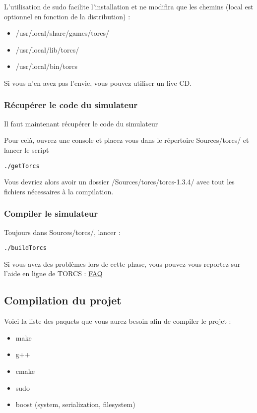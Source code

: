 \documentclass[a4paper,12pt]{article}
\begin{document}
  
  L'utilisation de sudo facilite l'installation et ne modifira que les chemins (local est optionnel en fonction de la
  distribution) : 
  \begin{itemize}
    \item /usr/local/share/games/torcs/
    \item /usr/local/lib/torcs/
    \item /usr/local/bin/torcs
  \end{itemize}

  Si vous n'en avez pas l'envie, vous pouvez utiliser un live CD.
  
  \subsubsection{Récupérer le code du simulateur}
  
  
  Il faut maintenant récupérer le code du simulateur 
  
  Pour celà, ouvrez une console et placez vous dans le répertoire Sources/torcs/ et lancer le script 
    \begin{lstlisting}
./getTorcs
    \end{lstlisting}
  Vous devriez alors avoir un dossier /Sources/torcs/torcs-1.3.4/ avec tout les fichiers nécessaires à la compilation.
 
   \subsubsection{Compiler le simulateur}
  
  Toujours dans Sources/torcs/, lancer :
  
  \begin{lstlisting}
./buildTorcs
    \end{lstlisting}
  
  Si vous avez des problèmes lors de cette phase, vous pouvez vous reportez sur l'aide en ligne de TORCS :
  \href{http://torcs.sourceforge.net/index.php?name=Sections&op=viewarticle&artid=30}{FAQ}
  
  \subsection{Compilation du projet}
  
  Voici la liste des paquets que vous aurez besoin afin de compiler le projet :
    
  \begin{itemize}
    \item make
    \item g++
    \item cmake
    \item sudo
    \item boost (system, serialization, filesystem)
  \end{itemize}
\end{document}
